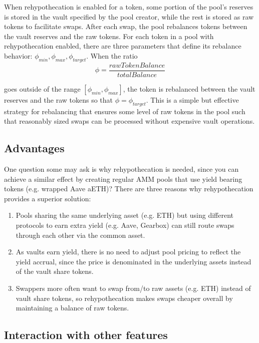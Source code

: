 \documentclass[twocolumn]{article}
\begin{document}
When rehypothecation is enabled for a token, some portion of the pool's reserves is stored in the vault specified by the pool creator, while the rest is stored as raw tokens to facilitate swaps. After each swap, the pool rebalances tokens between the vault reserves and the raw tokens. For each token in a pool with rehypothecation enabled, there are three parameters that define its rebalance behavior: $\phi_{min}, \phi_{max}, \phi_{target}$. When the ratio
\begin{equation}
\phi = \frac{rawTokenBalance}{totalBalance}  
\end{equation}

goes outside of the range $[\phi_{min}, \phi_{max}]$, the token is rebalanced between the vault reserves and the raw tokens so that $\phi = \phi_{target}$. This is a simple but effective strategy for rebalancing that ensures some level of raw tokens in the pool such that reasonably sized swaps can be processed without expensive vault operations.

\subsection{Advantages}

One question some may ask is why rehypothecation is needed, since you can achieve a similar effect by creating regular AMM pools that use yield bearing tokens (e.g. wrapped Aave aETH)? There are three reasons why rehypothecation provides a superior solution:

\begin{enumerate}
  \item Pools sharing the same underlying asset (e.g. ETH) but using different protocols to earn extra yield (e.g. Aave, Gearbox) can still route swaps through each other via the common asset.
  \item As vaults earn yield, there is no need to adjust pool pricing to reflect the yield accrual, since the price is denominated in the underlying assets instead of the vault share tokens.
  \item Swappers more often want to swap from/to raw assets (e.g. ETH) instead of vault share tokens, so rehypothecation makes swaps cheaper overall by maintaining a balance of raw tokens.
\end{enumerate}

\subsection{Interaction with other features}
\end{document}

